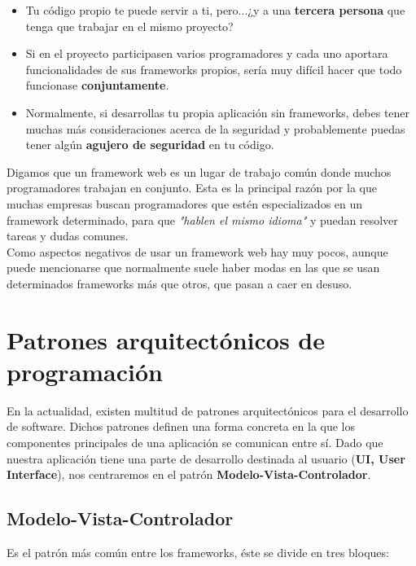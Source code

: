     \begin{itemize}
        \item Tu código propio te puede servir a ti, pero...¿y a una \textbf{tercera persona}
        que tenga que trabajar en el mismo proyecto?
        \item Si en el proyecto participasen varios programadores y cada uno aportara
        funcionalidades de sus frameworks propios, sería muy difícil hacer que todo
        funcionase \textbf{conjuntamente}.
        \item Normalmente, si desarrollas tu propia aplicación sin frameworks, debes
        tener muchas más consideraciones acerca de la seguridad y probablemente puedas
        tener algún \textbf{agujero de seguridad} en tu código.
    \end{itemize}

Digamos que un framework web es un lugar de trabajo común donde muchos programadores
trabajan en conjunto. Esta es la principal razón por la que muchas empresas buscan
programadores que estén especializados en un framework determinado, para que
\textit{"hablen el mismo idioma"} y puedan resolver tareas y dudas comunes.\\

Como aspectos negativos de usar un framework web hay muy pocos, aunque puede mencionarse
que normalmente suele haber modas en las que se usan determinados frameworks más que otros,
que pasan a caer en desuso.\\


\section{Patrones arquitectónicos de programación} \label{sec:architectural-patterns}
En la actualidad, existen multitud de patrones arquitectónicos para el desarrollo de
software. Dichos patrones definen una forma concreta en la que los componentes principales
de una aplicación se comunican entre sí. Dado que nuestra aplicación tiene una parte de
desarrollo destinada al usuario (\textbf{UI, User Interface}), nos centraremos en el patrón
\textbf{Modelo-Vista-Controlador}.

\subsection{Modelo-Vista-Controlador} \label{sec:mvc}
Es el patrón más común entre los frameworks, éste se divide en tres bloques:

